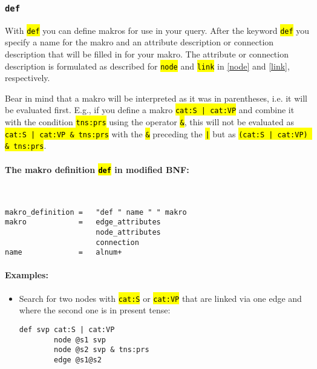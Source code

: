 \documentclass[12pt]{scrartcl}
\newcommand{\code}[1]{\hl{\texttt{#1}}}
\begin{document}
\subsubsection{\texttt{def}}\label{def}

With \code{def} you can define makros for use in your query.
After the keyword \code{def} you specify a name for the makro and an attribute description or connection description that will be filled in for your makro.
The attribute or connection description is formulated as described for \code{node} and \code{link} in \ref{node} and \ref{link}, respectively.

Bear in mind that a makro will be interpreted as it was in parentheses, i.e. it will be evaluated first.
E.g., if you define a makro \code{cat:S | cat:VP} and combine it with the condition \code{tns:prs} using the operator \code{\&}, this will not be evaluated as \code{cat:S | cat:VP \& tns:prs} with the \code{\&} preceding the \code{|} but as \code{(cat:S | cat:VP) \& tns:prs}.

\paragraph*{The makro definition \code{def} in modified BNF:}
~
\begin{lstlisting}
makro_definition =   "def " name " " makro
makro            =   edge_attributes
                     node_attributes
                     connection
name             =   alnum+
\end{lstlisting}


\paragraph*{Examples:}
\begin{itemize}
	\item Search for two nodes with \code{cat:S} or \code{cat:VP} that are linked via one edge and where the second one is in present tense:
	\begin{lstlisting}[gobble=8,aboveskip=.6em,belowskip=.2em]
		def svp cat:S | cat:VP
		node @s1 svp
		node @s2 svp & tns:prs
		edge @s1@s2
	\end{lstlisting}
\end{itemize}
\end{document}
